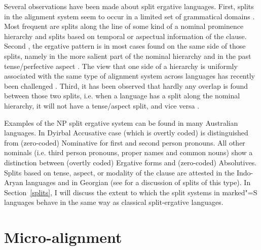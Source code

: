 Several observations have been made about split ergative languages. 
First, splits in the alignment system seem to occur in a limited set of grammatical domains \citep{Dixon:1994}. Most frequent are splits along the line of some kind of a nominal prominence hierarchy and splits based on temporal or aspectual information %
of the clause. 
Second
, the ergative pattern is in most cases found on the same side of those splits, namely in the more salient part of the nominal hierarchy \citep{Silverstein:1976} and in the past tense/perfective aspect \citep{Malchukov.tam}. 
The view that one side of a hierarchy is uniformly associated with the same type of alignment system across languages has recently been challenged \citep{Bickel.hierarchy}. %
Third, it has been observed that hardly any overlap is found between those two splits, i.e. when a language has a split along the nominal hierarchy, it will not have a tense/aspect split, and vice versa \citep{Trask:1979}. 

Examples of the NP split ergative system can be found in many Australian languages. 
In Dyirbal \citep{Dixon:1972} Accusative case (which is overtly coded)  is distinguished from (zero-coded) Nominative for first and second person pronouns. 
All other nominals (i.e. third person pronouns, proper names and common nouns) show a distinction between (overtly coded) Ergative forms and (zero-coded) Absolutives. 
Splits based on tense, aspect, or modality of the clause are attested in the Indo-Aryan languages and in Georgian (see \citet{Malchukov.tam} for a discussion of splits of this type). 
In Section~\ref{splits}, I will discuss the extent to which the split systems in marked"=S languages behave in the same way as classical split-ergative languages.

\section{Micro-alignment}\label{methods}

